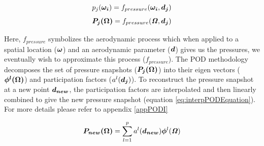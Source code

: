 \begin{equation} \label{eq:pijSnapshot}
p_{j}(\boldsymbol{\omega_{i}}) = f_{pressure}(\boldsymbol{\omega_{i}}, \boldsymbol{d_{j}})
\end{equation} 
\begin{equation}\label{eq:pressurefield}
\boldsymbol{P_{j}(\Omega)} = f_{pressure}(\bm{\mathit{\Omega}}, \boldsymbol{d_{j}})
\end{equation} 

Here, $f_{pressure}$ symbolizes the aerodynamic process which when applied to a spatial location ($\boldsymbol{\omega}$) and an aerodynamic parameter ($\boldsymbol{d}$) gives us the pressures, we eventually wish to approximate this process ($f_{pressure}$). The POD methodology decomposes the set of pressure snapshots ($\boldsymbol{P_{j}(\Omega)}$) into their eigen vectors ($\boldsymbol{\phi^{l}(\Omega)}$) and participation factors ($a^{l}(\boldsymbol{d_{j}})$). To reconstruct the pressure snapshot at a new point $\boldsymbol{d_{new}}$, the participation factors are interpolated and then linearly combined to give the new pressure snapshot (equation \ref{eq:interpPODEquation}). For more details please refer to appendix \ref{appPODI}

\begin{equation}\label{eq:interpPODEquation}
\boldsymbol{P_{new}(\Omega)} = \sum_{l=1}^{p}a^{l}(\boldsymbol{d_{new}}) \boldsymbol{\phi}^l(\bm{\mathit{\Omega}})
\end{equation}

